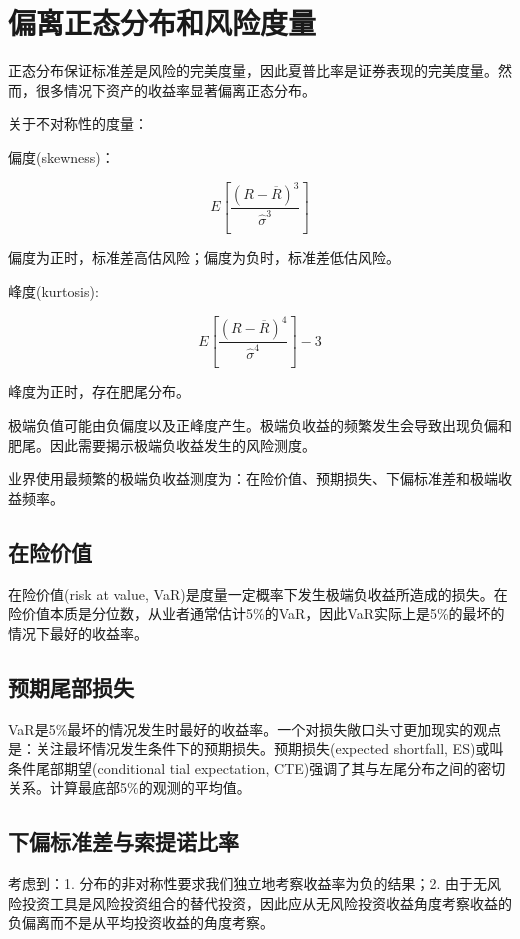 \documentclass{article}
\begin{document}
\section{偏离正态分布和风险度量}
正态分布保证标准差是风险的完美度量，因此夏普比率是证券表现的完美度量。然而，很多情况下资产的收益率显著偏离正态分布。

关于不对称性的度量：

偏度(skewness)：

\[ E[\frac{(R-\overline{R})^3}{\hat{\sigma}^3}] \]

偏度为正时，标准差高估风险；偏度为负时，标准差低估风险。

\hspace*{\fill}

峰度(kurtosis):

\[ E[\frac{(R-\overline{R})^4}{\hat{\sigma}^4}]-3 \]

峰度为正时，存在肥尾分布。

\hspace*{\fill}

极端负值可能由负偏度以及正峰度产生。极端负收益的频繁发生会导致出现负偏和肥尾。因此需要揭示极端负收益发生的风险测度。

业界使用最频繁的极端负收益测度为：在险价值、预期损失、下偏标准差和极端收益频率。

\subsection{在险价值}
在险价值(risk at value, VaR)是度量一定概率下发生极端负收益所造成的损失。在险价值本质是分位数，从业者通常估计5\%的VaR，因此VaR实际上是5\%的最坏的情况下最好的收益率。

\subsection{预期尾部损失}
VaR是5\%最坏的情况发生时最好的收益率。一个对损失敞口头寸更加现实的观点是：关注最坏情况发生条件下的预期损失。预期损失(expected shortfall, ES)或叫条件尾部期望(conditional tial expectation, CTE)强调了其与左尾分布之间的密切关系。计算最底部5\%的观测的平均值。

\subsection{下偏标准差与索提诺比率}
考虑到：1. 分布的非对称性要求我们独立地考察收益率为负的结果；2. 由于无风险投资工具是风险投资组合的替代投资，因此应从无风险投资收益角度考察收益的负偏离而不是从平均投资收益的角度考察。
\end{document}
